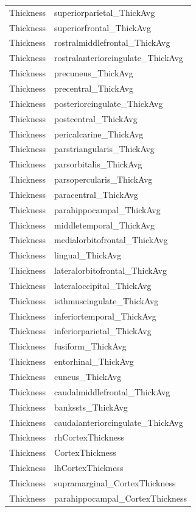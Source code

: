 \documentclass[pdflatex,sn-nature]{sn-jnl}%
\theoremstyle{thmstyleone}%
\theoremstyle{thmstyletwo}%
\theoremstyle{thmstylethree}%
\begin{document}
\begin{appendices}
\begin{small}
\begin{longtable}{l|l}
Thickness & superiorparietal\_ThickAvg \\
Thickness & superiorfrontal\_ThickAvg \\
Thickness & rostralmiddlefrontal\_ThickAvg \\
Thickness & rostralanteriorcingulate\_ThickAvg \\
Thickness & precuneus\_ThickAvg \\
Thickness & precentral\_ThickAvg \\
Thickness & posteriorcingulate\_ThickAvg \\
Thickness & postcentral\_ThickAvg \\
Thickness & pericalcarine\_ThickAvg \\
Thickness & parstriangularis\_ThickAvg \\
Thickness & parsorbitalis\_ThickAvg \\
Thickness & parsopercularis\_ThickAvg \\
Thickness & paracentral\_ThickAvg \\
Thickness & parahippocampal\_ThickAvg \\
Thickness & middletemporal\_ThickAvg \\
Thickness & medialorbitofrontal\_ThickAvg \\
Thickness & lingual\_ThickAvg \\
Thickness & lateralorbitofrontal\_ThickAvg \\
Thickness & lateraloccipital\_ThickAvg \\
Thickness & isthmuscingulate\_ThickAvg \\
Thickness & inferiortemporal\_ThickAvg \\
Thickness & inferiorparietal\_ThickAvg \\
Thickness & fusiform\_ThickAvg \\
Thickness & entorhinal\_ThickAvg \\
Thickness & cuneus\_ThickAvg \\
Thickness & caudalmiddlefrontal\_ThickAvg \\
Thickness & bankssts\_ThickAvg \\
Thickness & caudalanteriorcingulate\_ThickAvg \\
Thickness & rhCortexThickness \\
Thickness & CortexThickness \\
Thickness & lhCortexThickness \\
Thickness & supramarginal\_CortexThickness \\
Thickness & parahippocampal\_CortexThickness \\

\end{longtable}
\end{small}
\end{appendices}
\end{document}
